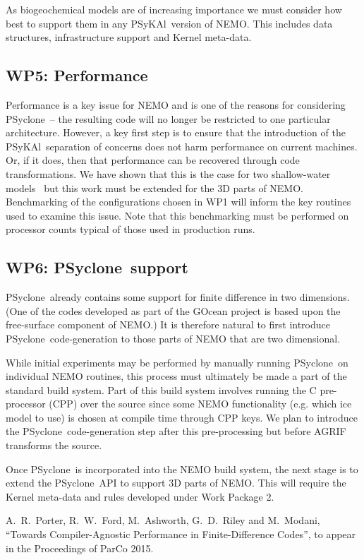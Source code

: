 \documentclass{article}
\newcommand{\psykal}{{PS}y{KA}l}
\newcommand{\psyclone}{{PS}yclone}
\begin{document}
As biogeochemical models are of increasing importance we must consider
how best to support them in any \psykal\ version of NEMO. This
includes data structures, infrastructure support and Kernel meta-data.

\subsection{WP5: Performance}
\label{wp5_perf}

Performance is a key issue for NEMO and is one of the reasons for
considering \psyclone\ -- the resulting code will no longer be
restricted to one particular architecture. However, a key first step
is to ensure that the introduction of the \psykal\ separation of
concerns does not harm performance on current machines. Or, if it
does, then that performance can be recovered through code
transformations. We have shown that this is the case for two
shallow-water models~\cite{psykal_shallow} but this work must be
extended for the 3D parts of NEMO. Benchmarking of the configurations
chosen in WP1 will inform the key routines used to examine this
issue. Note that this benchmarking must be performed on processor
counts typical of those used in production runs.

\subsection{WP6: \psyclone\ support}
\label{wp6_autogen}

\psyclone\ already contains some support for finite difference in two
dimensions.  (One of the codes developed as part of the GOcean project
is based upon the free-surface component of NEMO.) It is therefore
natural to first introduce \psyclone\ code-generation to those parts of NEMO
that are two dimensional.

While initial experiments may be performed by manually running
\psyclone\ on individual NEMO routines, this process must ultimately be
made a part of the standard build system. Part of this build system
involves running the C pre-processor (CPP) over the source since some
NEMO functionality (e.g. which ice model to use) is chosen at compile
time through CPP keys. We plan to introduce the \psyclone\
code-generation step after this pre-processing but before AGRIF
transforms the source.

Once \psyclone\ is incorporated into the NEMO build system, the next
stage is to extend the \psyclone\ API to support 3D parts of NEMO.  This
will require the Kernel meta-data and rules developed under Work
Package 2.

\begin{thebibliography}{1}

 A.~R.~Porter, R.~W.~Ford, M.~Ashworth, G.~D.~Riley and M.~Modani, ``Towards Compiler-Agnostic Performance in Finite-Difference Codes'', to appear in the Proceedings of ParCo 2015.

\end{thebibliography}
\end{document}
